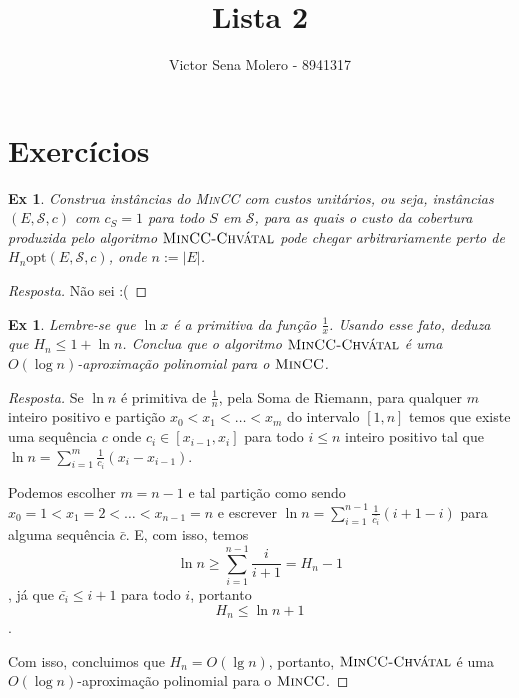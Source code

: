 \documentclass[12pt]{article}
\newcounter{exCounter}
\newtheorem{ex}[exCounter]{Ex}
\begin{document}
 
 
\title{Lista 2}
\author{Victor Sena Molero - 8941317}
\maketitle

\section{Exercícios}
\begin{ex}
Construa instâncias do \textsc{MinCC} com custos unitários, ou seja, instâncias $(E,\mathcal{S},c)$ com $c_S = 1$ para todo $S$ em $\mathcal{S}$, para as quais o custo da cobertura produzida pelo algoritmo $\textsc{MinCC-Chvátal}$ pode chegar arbitrariamente perto de $H_n\mathrm{opt}(E,\mathcal{S},c)$, onde $n := |E|$.
\end{ex}

\begin{proof}[Resposta]
Não sei :(
\end{proof}

\begin{ex}
Lembre-se que $\ln x$ é a primitiva da função $\frac{1}{x}$. Usando esse fato, deduza que $H_n \leq 1 + \ln n$. Conclua que o algoritmo $\textsc{MinCC-Chvátal}$ é uma $O(\log n)$-aproximação polinomial para o $\textsc{MinCC}$.
\end{ex}

\begin{proof}[Resposta]
Se $\ln n$ é primitiva de $\frac{1}{n}$, pela Soma de Riemann, para qualquer $m$ inteiro positivo e partição $x_0 < x_1 < \dots < x_m$ do intervalo $[1, n]$ temos que existe uma sequência $c$ onde $c_i \in [x_{i-1}, x_i]$ para todo $i \leq n$ inteiro positivo tal que $\ln n = \sum \limits_{i=1}^m \frac{1}{c_i} (x_i - x_{i-1})$.  

Podemos escolher $m = n-1$ e tal partição como sendo $x_0 = 1 < x_1 = 2 < \dots < x_{n-1} = n$ e escrever $\ln n = \sum \limits_{i=1}^{n-1} \frac{1}{\bar{c_i}} (i + 1 - i)$ para alguma sequência $\bar{c}$. E, com isso, temos  
$$\ln n \geq \sum \limits_{i=1}^{n-1} \frac{i}{i+1} = H_n - 1$$, já que $\bar{c_i} \leq i+1$ para todo $i$, portanto
$$H_n \leq \ln n + 1$$.  

Com isso, concluimos que $H_n = O(\lg n)$, portanto, $\textsc{MinCC-Chvátal}$ é uma $O(\log n)$-aproximação polinomial para o $\textsc{MinCC}$.
\end{proof}
\end{document}
